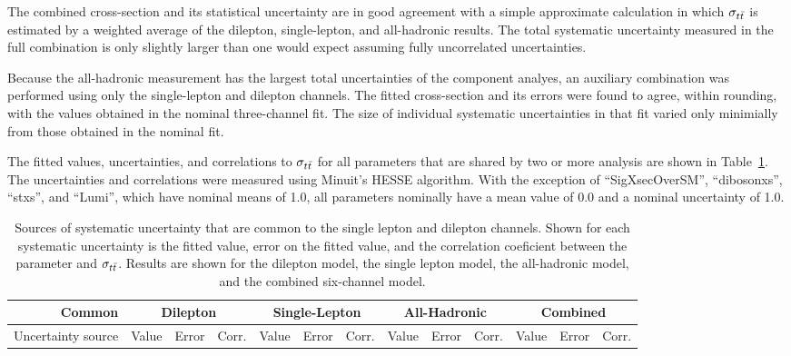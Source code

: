 The combined cross-section and its statistical uncertainty are in good agreement with a simple approximate calculation in which $\sigma_{t\bar{t}}$ is estimated by a weighted average of the dilepton, single-lepton, and all-hadronic results.
The total systematic uncertainty measured in the full combination is only slightly larger than one would expect assuming fully uncorrelated uncertainties. 

Because the all-hadronic measurement has the largest total uncertainties of the component analyes, an auxiliary combination was performed using only the single-lepton and dilepton channels.
The fitted cross-section and its errors were found to agree, within rounding, with the values obtained in the nominal three-channel fit.
The size of individual systematic uncertainties in that fit varied only minimially from those obtained in the nominal fit.






The fitted values, uncertainties, and correlations to $\sigma_{ t\bar{t} }$ for all parameters that are shared by two or more analysis are shown in Table~\ref{tab:commonFittedParams}.
The uncertainties and correlations were measured using Minuit's HESSE algorithm.
With the exception of ``SigXsecOverSM'', ``dibosonxs'', ``stxs'', and ``Lumi'', which have nominal means of 1.0, all parameters nominally have a mean value of 0.0 and a nominal uncertainty of 1.0.



\begin{table}[htbp]

  \begin{center}  
    \begin{tabular}{|r|ccc|ccc|ccc|ccc|} 
      \hline
      Common & \multicolumn{3}{|c|}{Dilepton}  & \multicolumn{3}{|c|}{Single-Lepton} & \multicolumn{3}{|c|}{All-Hadronic} & \multicolumn{3}{|c|}{Combined} \\
      \hline
      Uncertainty source & Value & Error & Corr. & Value & Error & Corr. & Value & Error & Corr. & Value & Error & Corr. \\
      \hline
      
      \hline
    \end{tabular}
  \end{center}
  \caption{ \label{tab:commonFittedParams} Sources of systematic uncertainty that are common to the single lepton and dilepton channels.  Shown for each systematic uncertainty is the fitted value, error on the fitted value, and the correlation coeficient between the parameter and $\sigma_{t\bar{t}}$.  Results are shown for the dilepton model, the single lepton model, the all-hadronic model, and the combined six-channel model. }
\end{table}

